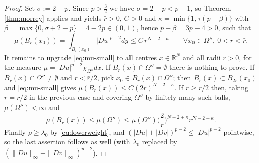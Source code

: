 \documentclass[reqno]{amsart}
\theoremstyle{plain}
\theoremstyle{definition}
\theoremstyle{remark}
\newcommand{\R}{\mathbb{R}}
\begin{document}
\begin{proof}
Set $\sigma:=2-p$. Since $p>\frac32$ we have $\sigma=2-p<p-1$, so Theorem \ref{thm:morrey} applies
and yields $\bar r>0$, $C>0$ and $\kappa=\min\{1,\tau(p-\beta)\}$ with
$\beta=\max\{0,\sigma+2-p\}=4-2p\in(0,1)$, hence $p-\beta=3p-4>0$, such that
\begin{equation}\label{eq:mu-small}
\mu(B_r(x_0))=\int_{B_r(x_0)}|Du|^{p-2}dy\le C\,r^{N-2+\kappa}\qquad\forall x_0\in\Omega'',\ 0<r<\bar r .
\end{equation}
It remains to upgrade \eqref{eq:mu-small} to all centres $x\in\R^N$ and all radii $r>0$, for the
measure $\mu=|Du|^{p-2}\chi_{\Omega''}dx$. If $B_r(x)\cap\Omega''=\emptyset$ there is nothing to
prove. If $B_r(x)\cap\Omega''\ne\emptyset$ and $r<\bar r/2$, pick $x_0\in B_r(x)\cap\Omega''$; then
$B_r(x)\subset B_{2r}(x_0)$ and \eqref{eq:mu-small} gives
$\mu(B_r(x))\le C(2r)^{N-2+\kappa}$. If $r\ge\bar r/2$ then, taking $r=\bar r/2$ in the previous case
and covering $\Omega''$ by finitely many such balls, $\mu(\Omega'')<\infty$ and
\[
\mu(B_r(x))\le\mu(\Omega'')\le\mu(\Omega'')\Big(\frac{2}{\bar r}\Big)^{N-2+\kappa}r^{N-2+\kappa} .
\]
Finally $\rho\ge\lambda_0$ by \eqref{eq:lowerweight}, and
$(|Du|+|Dv|)^{p-2}\le|Du|^{p-2}$ pointwise, so the last assertion follows as well (with
$\lambda_0$ replaced by $(\|Du\|_\infty+\|Dv\|_\infty)^{p-2}$).
\end{proof}
\end{document}
